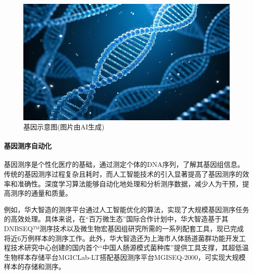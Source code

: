 \begin{figure}[ht]
  \centering
  \includegraphics[width=\linewidth]{image/4/基因测序.png}
  \caption{基因示意图(图片由AI生成)}
  \label{fig:gene}
\end{figure}
\paragraph{基因测序自动化}



基因测序是个性化医疗的基础，通过测定个体的DNA序列，了解其基因组信息。传统的基因测序过程复杂且耗时，而人工智能技术的引入显著提高了基因测序的效率和准确性。深度学习算法能够自动化地处理和分析测序数据，减少人为干预，提高测序的通量和质量。

例如，华大智造的测序平台通过人工智能优化的算法，实现了大规模基因测序任务的高效处理。具体来说，在“百万微生态”国际合作计划中，华大智造基于其DNBSEQ™测序技术以及微生物宏基因组研究所需的一系列配套工具，现已完成将近6万例样本的测序工作。此外，华大智造还为上海市人体肠道菌群功能开发工程技术研究中心创建的国内首个“中国人肠源模式菌种库”提供工具支撑，其超低温生物样本存储平台MGICLab-LT搭配基因测序平台MGISEQ-2000，可实现大规模样本的存储和测序。


